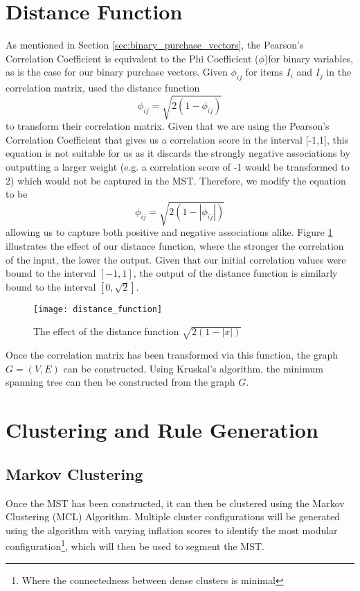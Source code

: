 \section{Distance Function}
\label{sec:distance}
As mentioned in Section \ref{sec:binary_purchase_vectors}, the Pearson's Correlation Coefficient is equivalent to the Phi Coefficient ($\phi$)for binary variables, as is the case for our binary purchase vectors. Given $\phi_{ij}$ for items $I_i$ and $I_j$ in the correlation matrix,  used the distance function
\[
\phi_{ij} = \sqrt{2(1-\phi_{ij})}
\]
to transform their correlation matrix. Given that we are using the Pearson's Correlation Coefficient that gives us a correlation score in the interval [-1,1], this equation is not suitable for us as it discards the strongly negative associations by outputting a larger weight (e.g. a correlation score of -1 would be transformed to 2) which would not be captured in the MST. Therefore, we modify the equation to be
\[
\phi_{ij} = \sqrt{2(1-|\phi_{ij}|)}
\]
allowing us to capture both positive and negative associations alike. Figure \ref{fig:distance_function} illustrates the effect of our distance function, where the stronger the correlation of the input, the lower the output. Given that our initial correlation values were bound to the interval $[-1,1]$, the output of the distance function is similarly bound to the interval $[0, \sqrt{2}]$.
\begin{figure}[H]
\centering
\texttt{[image: distance\_function]}
\label{fig:distance_function}
\caption{The effect of the distance function $\sqrt{2(1-|x|)}$}
\end{figure}
\noindent Once the correlation matrix has been transformed via this function, the graph $G=(V,E)$ can be constructed. Using Kruskal's algorithm, the minimum spanning tree can then be constructed from the graph $G$.

\section{Clustering and Rule Generation}
\subsection{Markov Clustering}
Once the MST has been constructed, it can then be clustered using the Markov Clustering (MCL) Algorithm. Multiple cluster configurations will be generated using the algorithm with varying inflation scores to identify the most modular configuration\footnote{Where the connectedness between dense clusters is minimal}, which will then be used to segment the MST.

